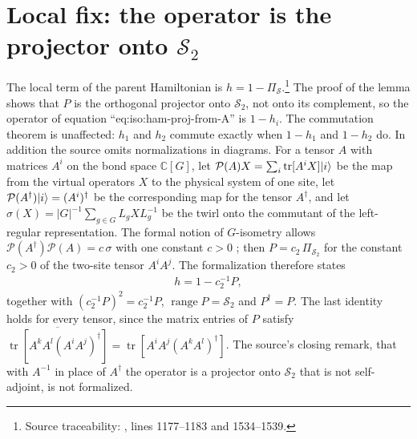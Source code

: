 \documentclass{article}
\begin{document}
\section{Local fix: the operator is the projector onto $\mathcal S_2$}
The local term of the parent Hamiltonian is
$h=1-\Pi_{\mathcal S}$.\footnote{Source traceability:
    , lines 1177--1183 and 1534--1539.}
The proof of the lemma shows that $P$ is the orthogonal projector onto
$\mathcal S_2$, not onto its complement, so the operator of
equation ``eq:iso:ham-proj-from-A'' is $1-h_i$. The commutation theorem is
unaffected: $h_1$ and $h_2$ commute exactly when $1-h_1$ and $1-h_2$ do.
In addition the source omits normalizations in diagrams. For a tensor $A$
with matrices $A^i$ on the bond space $\mathbb C[G]$, let
$\mathcal P(A)X=\sum_i\operatorname{tr}[A^iX]|i\rangle$ be the map from the
virtual operators $X$ to the physical system of one site, let
$\mathcal P(A^\dagger)|i\rangle=(A^i)^\dagger$ be the corresponding map for the
tensor $A^\dagger$, and let
$\sigma(X)=|G|^{-1}\sum_{g\in G}L_gXL_g^{-1}$ be the twirl onto the
commutant of the left-regular representation. The formal notion of
$G$-isometry allows $\mathcal P(A^\dagger)\mathcal P(A)=c\,\sigma$
with one constant $c>0$ \cite{gap:rmp_peps_quantum_double_g_isometry}; then
$P=c_2\,\Pi_{\mathcal S_2}$ for the constant $c_2>0$ of the two-site tensor
$A^iA^j$. The formalization therefore states
\begin{align}
    h=1-c_2^{-1}P,
    \label{eq:scp10_local_term}
\end{align}
together with $(c_2^{-1}P)^2=c_2^{-1}P$, $\operatorname{range}P=\mathcal S_2$
and $P^\dagger=P$. The last identity holds for every tensor, since the
matrix entries of $P$ satisfy
$\overline{\operatorname{tr}[A^kA^l(A^iA^j)^\dagger]}
    =\operatorname{tr}[A^iA^j(A^kA^l)^\dagger]$. The source's closing remark,
that with $A^{-1}$ in place of $A^\dagger$ the operator is a projector onto
$\mathcal S_2$ that is not self-adjoint, is not formalized.
\end{document}
